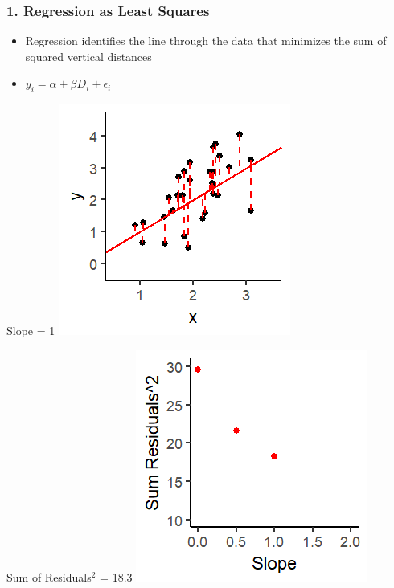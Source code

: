 \documentclass[xcolor=x11names,compress]{beamer}\usepackage[]{graphicx}\usepackage[]{color}
\makeatletter
\def\maxwidth{ %
  \ifdim\Gin@nat@width>\linewidth
    \linewidth
  \else
    \Gin@nat@width
  \fi
}
\newenvironment{knitrout}{}{} %
\renewcommand{\(}{\begin{columns}}
\renewcommand{\)}{\end{columns}}
\newcommand{\<}[1]{\begin{column}{#1}}
\renewcommand{\>}{\end{column}}
\makeatother
\begin{document}
\begin{frame}
\frametitle{1. Regression as Least Squares}
\begin{itemize}
\item Regression identifies the line through the data that minimizes the sum of squared vertical distances 
\item $y_i = \alpha + \beta D_i + \epsilon_i$
\end{itemize}
\begin{multicols}{2}
Slope = 1
\begin{knitrout}
\color{fgcolor}
\includegraphics[width=\maxwidth]{figure/graph_ols3-1} 

\end{knitrout}
\columnbreak
Sum of Residuals$^2$ = 18.3
\begin{knitrout}
\color{fgcolor}
\includegraphics[width=\maxwidth]{figure/graph_ssr3-1} 

\end{knitrout}
\end{multicols}
\end{frame}
\end{document}
